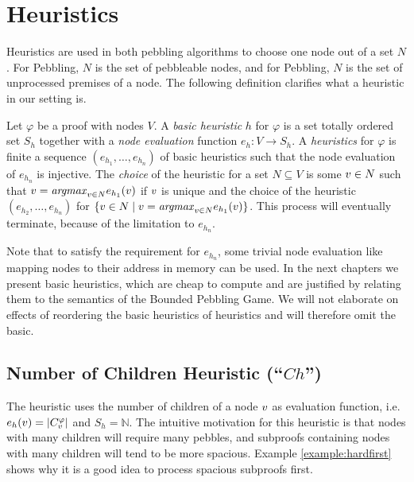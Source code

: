 \section{Heuristics}
\label{sec:heuristics}

Heuristics are used in both pebbling algorithms to choose one node out of a set $N$. 
For  Pebbling, $N$ is the set of pebbleable nodes, and for  Pebbling, $N$ is the set of unprocessed premises of a node. 
The following definition clarifies what a heuristic in our setting is.

\begin{definition}

Let $\varphi$ be a proof with nodes $V$.
A \emph{basic heuristic} $h$ for $\varphi$ is a set totally ordered set $S_h$ together with a \emph{node evaluation} function $e_h: V \rightarrow S_h$.
A \emph{heuristics} for $\varphi$ is finite a sequence $(e_{h_1}, \ldots, e_{h_n})$ of basic heuristics such that the node evaluation of $e_{h_n}$ is injective.
The \emph{choice} of the heuristic for a set $N \subseteq V$ is some $v \in N$ such that $v = \mathit{argmax}_{v \in N} e_{h_1}(v)$ if $v$ is unique and the choice of the heuristic $(e_{h_2},\ldots,e_{h_n})$ for $\{v \in N \mid v = \mathit{argmax}_{v \in N} e_{h_1}(v)\}$. This process will eventually terminate, because of the limitation to $e_{h_n}$.

\end{definition}

Note that to satisfy the requirement for $e_{h_n}$, some trivial node evaluation like mapping nodes to their address in memory can be used.
In the next chapters we present basic heuristics, which are cheap to compute and are justified by relating them to the semantics of the Bounded Pebbling Game.
We will not elaborate on effects of reordering the basic heuristics of heuristics and will therefore omit the basic.

\subsection{Number of Children Heuristic (``$Ch$'')}
\label{sec:children}
The  heuristic uses the number of children of a node $v$ as evaluation function, i.e. $e_h(v) = |C_{v}^{\varphi}|$ and $S_h = \mathbb{N}$.
The intuitive motivation for this heuristic is that nodes with many children will require many pebbles, and subproofs containing nodes with many children will tend to be more spacious. Example \ref{example:hardfirst} shows why it is a good idea to process spacious subproofs first.

